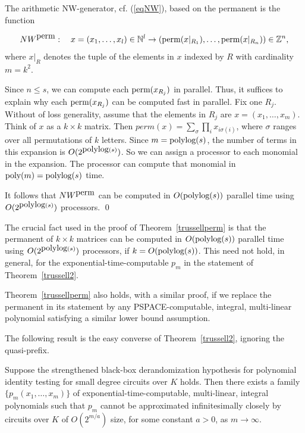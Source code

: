 \documentclass[11pt]{article}
\begin{document}
The arithmetic NW-generator, cf. (\ref{eqNW}),  
based on the permanent is the function 

\begin{equation} 
NW^{{\mbox {perm}}}:  
\quad x=(x_1,\ldots,x_l) \in \mathbb{N}^l \rightarrow 
({\mbox {perm}}(x|_{R_1}),\ldots, {\mbox {perm}}(x|_{R_n})) \in \mathbb{Z}^n, 
\end{equation}
where $x|_{R}$ denotes the tuple of the elements in $x$ indexed by $R$ with cardinality 
$m=k^2$. 

Since  $n \le s$, we can compute each ${\mbox {perm}}(x_{R_j})$ in parallel. 
Thus, it suffices to explain 
why each ${\mbox {perm}}(x_{R_j})$ can be computed fast in parallel. 
Fix one $R_j$. Without of loss generality, assume that the elements in $R_j$
are $x=(x_1,\ldots,x_m)$. Think of $x$ as a $k\times k$ matrix. Then
$perm(x)=\sum_{\sigma} \prod_i x_{i \sigma(i)}$,
where $\sigma$ ranges over all permutations of $k$ letters. Since $m={\mbox {polylog}}(s)$,
the number of terms in this expansion is $O(2^{{\mbox {polylog}}(s)})$. 
So we can assign a processor 
to each monomial in the expansion. The processor can compute that monomial 
in ${\mbox {poly}}(m)={\mbox {polylog}}(s)$ time. 

It follows that $NW^{{\mbox {perm}}}$ can be computed in $O({\mbox {polylog}}(s))$ parallel time using
$O(2^{{\mbox {polylog}}(s)})$ processors.
\qed 

 The
crucial fact used in the proof of Theorem~\ref{trussellperm} is 
that the permanent of $k \times k$ matrices can be computed in 
$O({\mbox {polylog}}(s))$ parallel time using
$O(2^{{\mbox {polylog}}(s)})$ processors, if $k=O({\mbox {polylog}}(s))$. This need not hold, in general,
for the  exponential-time-computable $p_m$ in the statement of Theorem~\ref{trussell2}. 

Theorem~\ref{trussellperm}
also holds, with a similar proof, if we replace the permanent in its statement by any 
PSPACE-computable, integral, multi-linear polynomial  satisfying a similar  lower bound 
assumption. 

The following result is the easy converse of Theorem~\ref{trussell2}, ignoring the quasi-prefix.

\begin{prop} \label{pconverserussell}
Suppose the strengthened black-box derandomization hypothesis for  polynomial identity testing for small degree 
circuits over $K$ holds. Then
there exists a family $\{p_m(x_1,\ldots,x_m)\}$ of
exponential-time-computable,   multi-linear, integral 
polynomials such that  $p_m$  cannot be approximated infinitesimally closely  by   circuits  over $K$ of  
$O(2^{m/a})$ size, for some constant $a>0$, as $m \rightarrow \infty$.  
\end{prop}
\end{document}
